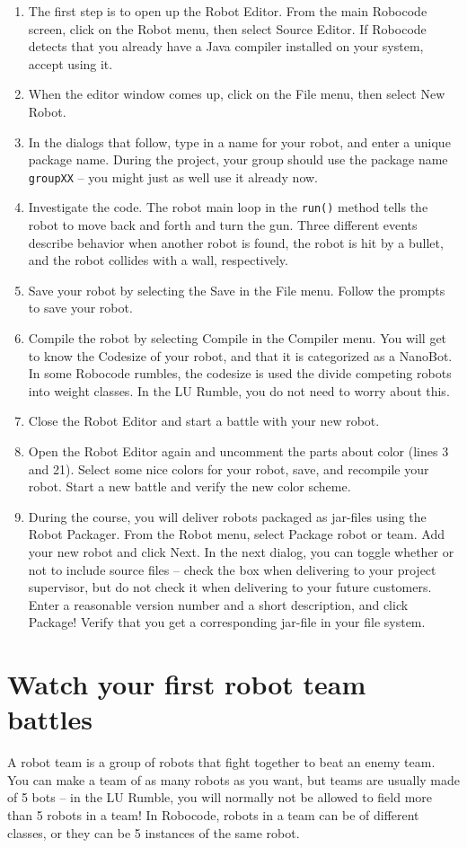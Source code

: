 \documentclass{scrreprt}
\begin{document}
\begin{enumerate}
\item The first step is to open up the Robot Editor. From the main Robocode screen, click on the Robot menu, then select Source Editor. If Robocode detects that you already have a Java compiler installed on your system, accept using it.
\item When the editor window comes up, click on the File menu, then select New Robot. 
\item In the dialogs that follow, type in a name for your robot, and enter a unique package name. During the project, your group should use the package name \texttt{groupXX} -- you might just as well use it already now.
\item Investigate the code. The robot main loop in the \texttt{run()} method tells the robot to move back and forth and turn the gun. Three different events describe behavior when another robot is found, the robot is hit by a bullet, and the robot collides with a wall, respectively.
\item Save your robot by selecting the Save in the File menu. Follow the prompts to save your robot. 
\item Compile the robot by selecting Compile in the Compiler menu. You will get to know the Codesize of your robot, and that it is categorized as a NanoBot. In some Robocode rumbles, the codesize is used the divide competing robots into weight classes. In the LU Rumble, you do not need to worry about this.
\item Close the Robot Editor and start a battle with your new robot.
\item Open the Robot Editor again and uncomment the parts about color (lines 3 and 21). Select some nice colors for your robot, save, and recompile your robot. Start a new battle and verify the new color scheme. 
\item During the course, you will deliver robots packaged as jar-files using the Robot Packager. From the Robot menu, select Package robot or team. Add your new robot and click Next. In the next dialog, you can toggle whether or not to include source files -- check the box when delivering to your project supervisor, but do not check it when delivering to your future customers. Enter a reasonable version number and a short description, and click Package! Verify that you get a corresponding jar-file in your file system.
\end{enumerate}

\section{Watch your first robot team battles} \label{sec:team}
A robot team is a group of robots that fight together to beat an enemy team. You can make a team of as many robots as you want, but teams are usually made of 5 bots -- in the LU Rumble, you will normally not be allowed to field more than 5 robots in a team! In Robocode, robots in a team can be of different classes, or they can be 5 instances of the same robot.
\end{document}
